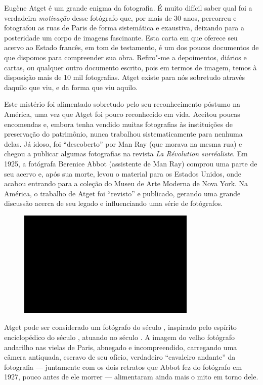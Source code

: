 Eugène Atget é um grande enigma da fotografia. É muito difícil saber
qual foi a verdadeira \emph{motivação} desse fotógrafo que, por mais de
30 anos, percorreu e fotografou as ruas de Paris de forma sistemática e
exaustiva, deixando para a posteridade um corpo de imagens fascinante.
Esta carta em que oferece seu acervo ao Estado francês, em tom de
testamento, é um dos poucos documentos de que dispomos para compreender
sua obra. Refiro"-me a depoimentos, diários e cartas, ou qualquer outro
documento escrito, pois em termos de imagem, temos à disposição mais de
10 mil fotografias. Atget existe para nós sobretudo através daquilo que
viu, e da forma que viu aquilo.

Este mistério foi alimentado sobretudo pelo seu reconhecimento póstumo
na América, uma vez que Atget foi pouco reconhecido em vida. Aceitou
poucas encomendas e, embora tenha vendido muitas fotografias às
instituições de preservação do patrimônio, nunca trabalhou
sistematicamente para nenhuma delas. Já idoso, foi ``descoberto'' por
Man Ray (que morava na mesma rua) e chegou a publicar algumas
fotografias na revista \emph{La Révolution surréaliste}. Em 1925, a
fotógrafa Berenice Abbot (assistente de Man Ray) comprou uma parte de
seu acervo e, após sua morte, levou o material para os Estados Unidos,
onde acabou entrando para a coleção do Museu de Arte Moderna de Nova
York. Na América, o trabalho de Atget foi ``revisto'' e publicado,
gerando uma grande discussão acerca de seu legado e influenciando uma
série de fotógrafos.

\begin{figure}[!ht]
\centering
 \includegraphics[width=85mm]{./imgs/im1.jpg}
\caption{\tiny{}}
\end{figure}

Atget pode ser considerado um fotógrafo do século , inspirado pelo
espírito enciclopédico do século , atuando no século . A imagem
do velho fotógrafo andarilho nas vielas de Paris, abnegado e
incompreendido, carregando uma câmera antiquada, escravo de seu ofício,
verdadeiro ``cavaleiro andante'' da fotografia --- juntamente com os dois
retratos que Abbot fez do fotógrafo em 1927, pouco antes de ele morrer
--- alimentaram ainda mais o mito em torno dele.

